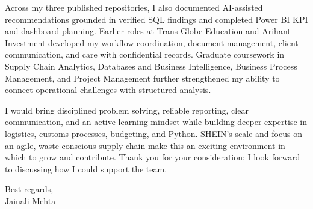 \documentclass[letterpaper,11pt]{article}
\begin{document}
\bigbreak
Across my three published repositories, I also documented AI-assisted recommendations grounded in verified SQL findings and completed Power BI KPI and dashboard planning. Earlier roles at Trans Globe Education and Arihant Investment developed my workflow coordination, document management, client communication, and care with confidential records. Graduate coursework in Supply Chain Analytics, Databases and Business Intelligence, Business Process Management, and Project Management further strengthened my ability to connect operational challenges with structured analysis.

\bigbreak
I would bring disciplined problem solving, reliable reporting, clear communication, and an active-learning mindset while building deeper expertise in logistics, customs processes, budgeting, and Python. SHEIN's scale and focus on an agile, waste-conscious supply chain make this an exciting environment in which to grow and contribute. Thank you for your consideration; I look forward to discussing how I could support the team.

\bigbreak
Best regards,\\
Jainali Mehta
\end{document}
